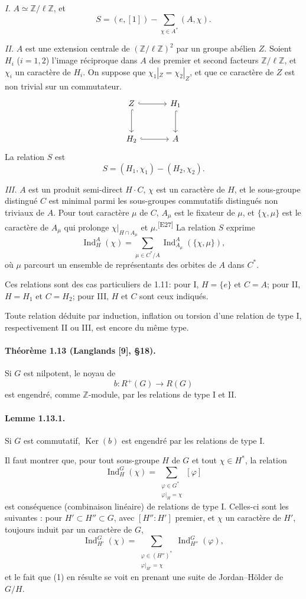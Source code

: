 \documentclass[10pt,letterpaper]{article}
\newcommand{\Z}{\mathbb Z}
\newcommand{\Ind}{\operatorname{Ind}}
\providecommand{\Ker}{\operatorname{Ker}}
\providecommand{\Ind}{\operatorname{Ind}}
\providecommand{\Ker}{\operatorname{Ker}}
\newcommand{\auditmark}[1]{\textsuperscript{\normalfont\scriptsize[E#1]}}
\begin{document}
\emph{I.} \(A\simeq\Z/\ell\Z\), et
\[
 S=(e,[1])-\sum_{\chi\in A^*}(A,\chi).
\]

\emph{II.} \(A\) est une extension centrale de \((\Z/\ell\Z)^2\) par un groupe abélien \(Z\). Soient \(H_i\) (\(i=1,2\)) l'image réciproque dans \(A\) des premier et second facteurs \(\Z/\ell\Z\), et \(\chi_i\) un caractère de \(H_i\). On suppose que \(\chi_1|_Z=\chi_2|_Z\), et que ce caractère de \(Z\) est non trivial sur un commutateur.
\[
\begin{tikzcd}[column sep=3.2em,row sep=2.7em]
Z \arrow[r,hook] \arrow[d,hook] & H_1 \arrow[d,hook]\\
H_2 \arrow[r,hook] & A
\end{tikzcd}
\]
La relation \(S\) est
\[
S=(H_1,\chi_1)-(H_2,\chi_2).
\]

\emph{III.} \(A\) est un produit semi-direct \(H\cdot C\), \(\chi\) est un caractère de \(H\), et le sous-groupe distingué \(C\) est minimal parmi les sous-groupes commutatifs distingués non triviaux de \(A\). Pour tout caractère \(\mu\) de \(C\), \(A_\mu\) est le fixateur de \(\mu\), et \(\{\chi,\mu\}\) est le caractère de \(A_\mu\) qui prolonge \(\chi|_{H\cap A_\mu}\) et \(\mu\).\auditmark{27} La relation \(S\) exprime
\[
\Ind_H^A(\chi)=
\sum_{\mu\in C^*/A}
\Ind_{A_\mu}^A(\{\chi,\mu\}),
\]
où \(\mu\) parcourt un ensemble de représentants des orbites de \(A\) dans \(C^*\).

Ces relations sont des cas particuliers de 1.11: pour I, \(H=\{e\}\) et \(C=A\); pour II, \(H=H_1\) et \(C=H_2\); pour III, \(H\) et \(C\) sont ceux indiqués.

Toute relation déduite par induction, inflation ou torsion d'une relation de type I, respectivement II ou III, est encore du même type.

\paragraph{Théorème 1.13 (Langlands [9], §18).} Si \(G\) est nilpotent, le noyau de
\[
b:R^+(G)\longrightarrow R(G)
\]
est engendré, comme \(\Z\)-module, par les relations de type I et II.

\paragraph{Lemme 1.13.1.} Si \(G\) est commutatif, \(\Ker(b)\) est engendré par les relations de type I.

Il faut montrer que, pour tout sous-groupe \(H\) de \(G\) et tout \(\chi\in H^*\), la relation
\[
\tag{1}
\Ind_H^G(\chi)=
\sum_{\substack{\varphi\in G^*\\ \varphi|_H=\chi}}[\varphi]
\]
est conséquence (combinaison linéaire) de relations de type I. Celles-ci sont les suivantes : pour \(H'\subset H''\subset G\), avec \([H'':H']\) premier, et \(\chi\) un caractère de \(H'\), toujours induit par un caractère de \(G\),
\[
\Ind_{H'}^G(\chi)=
\sum_{\substack{\varphi\in (H'')^*\\ \varphi|_{H'}=\chi}}
\Ind_{H''}^G(\varphi),
\]
et le fait que (1) en résulte se voit en prenant une suite de Jordan--Hölder de \(G/H\).
\end{document}
